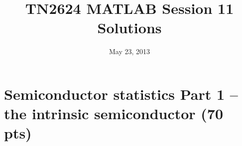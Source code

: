 \documentclass[11pt]{article}
\begin{document}
\title{TN2624 MATLAB Session 11\\Solutions}
\date{May 23, 2013}
\maketitle



\section*{Semiconductor statistics Part 1  -- the intrinsic semiconductor (70 pts)}
\label{sec:lot}
\end{document}
